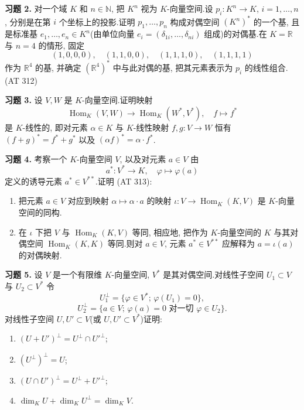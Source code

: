 \noindent\textbf{习题 2.} 对一个域 $K$ 和 $n \in \mathbb{N}$, 把 $K^n$ 视为 $K$-向量空间.设 $p_i \colon K^n \longrightarrow K$, $i = 1, \ldots, n$, 分别是在第 $i$ 个坐标上的投影.证明 $p_1, \ldots, p_n$ 构成对偶空间 $(K^n)^*$ 的一个基, 且是标准基 $e_1, \ldots, e_n \in K^n$(由单位向量 $e_i = (\delta_{1i}, \ldots, \delta_{ni})$ 组成)的对偶基.在 $K = \mathbb{R}$ 与 $n = 4$ 的情形, 固定
\[
(1, 0, 0, 0), \quad (1, 1, 0, 0), \quad (1, 1, 1, 0), \quad (1, 1, 1, 1)
\]
作为 $\mathbb{R}^4$ 的基, 并确定 $(\mathbb{R}^4)^*$ 中与此对偶的基, 把其元素表示为 $p_i$ 的线性组合.(AT 312)

\noindent\textbf{习题 3.} 设 $V, W$ 是 $K$-向量空间.证明映射
\[
\operatorname{Hom}_K(V, W) \longrightarrow \operatorname{Hom}_K(W^*, V^*), \quad f \longmapsto f^*
\]
是 $K$-线性的, 即对元素 $\alpha \in K$ 与 $K$-线性映射 $f, g \colon V \longrightarrow W$ 恒有 $(f + g)^* = f^* + g^*$ 以及 $(\alpha f)^* = \alpha \cdot f^*$.

\noindent\textbf{习题 4.} 考察一个 $K$-向量空间 $V$, 以及对元素 $a \in V$ 由
\[
a^* \colon V^* \longrightarrow K, \quad \varphi \longmapsto \varphi(a)
\]
定义的诱导元素 $a^* \in V^{**}$.证明 (AT 313):
\begin{enumerate}
\item[(i)] 把元素 $a \in V$ 对应到映射 $\alpha \longmapsto \alpha \cdot a$ 的映射 $\iota \colon V \longrightarrow \operatorname{Hom}_K(K, V)$ 是 $K$-向量空间的同构.
\item[(ii)] 在 $\iota$ 下把 $V$ 与 $\operatorname{Hom}_K(K, V)$ 等同, 相应地, 把作为 $K$-向量空间的 $K$ 与其对偶空间 $\operatorname{Hom}_K(K, K)$ 等同.则对 $a \in V$, 元素 $a^* \in V^{**}$ 应解释为 $a = \iota(a)$ 的对偶映射.
\end{enumerate}

\noindent\textbf{习题 5.} 设 $V$ 是一个有限维 $K$-向量空间, $V^*$ 是其对偶空间.对线性子空间 $U_1 \subset V$ 与 $U_2 \subset V^*$ 令
\[
U_1^{\perp} = \{\varphi \in V^*;\, \varphi(U_1) = 0\},
\]
\[
U_2^{\perp} = \{a \in V;\, \varphi(a) = 0 \text{ 对一切 } \varphi \in U_2\}\text{.}
\]
对线性子空间 $U, U' \subset V$(或 $U, U' \subset V^*$)证明:
\begin{enumerate}
\item[(i)] $(U + U')^{\perp} = U^{\perp} \cap U'^{\perp}$;
\item[(ii)] $(U^{\perp})^{\perp} = U$;
\item[(iii)] $(U \cap U')^{\perp} = U^{\perp} + U'^{\perp}$;
\item[(iv)] $\dim_K U + \dim_K U^{\perp} = \dim_K V$.
\end{enumerate}

